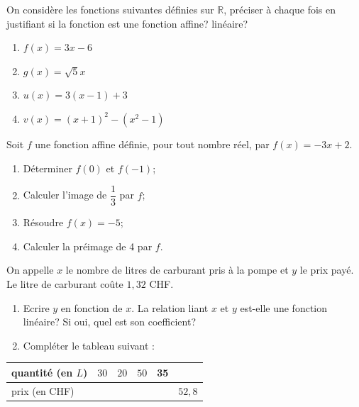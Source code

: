 

\begin{exercice}
On considère les fonctions suivantes définies sur $\mathbb{R}$, préciser à chaque fois en justifiant si la fonction est une fonction affine? linéaire?
\begin{enumerate}
\item $f(x)=3x-6$
\item $g(x)=\sqrt{5}x$
\item $u(x)=3(x-1)+3$
\item $v(x)=(x+1)^2-(x^2-1)$
\end{enumerate}
\end{exercice}

\begin{exercice}
Soit $f$ une fonction affine définie, pour tout nombre réel, par $f(x)=-3x+2$.
\begin{enumerate}
\item Déterminer $f(0)$ et $f(-1)$;
\item Calculer l'image de $\dfrac{1}{3}$ par $f$;
\item Résoudre $f(x)=-5$;
\item Calculer la préimage de 4 par $f$.
\end{enumerate}
\end{exercice}

\begin{exercice}
On appelle $x$ le nombre de litres de carburant pris à la pompe et $y$ le prix payé. Le litre de carburant coûte $1,32$ CHF.
\begin{enumerate}
\item Ecrire $y$ en fonction de $x$. La relation liant $x$ et $y$ est-elle une fonction linéaire? Si oui, quel est son coefficient?
\item Compléter le tableau suivant :
\end{enumerate}
\renewcommand{\arraystretch}{2}
\begin{tabular}{|p{1.2cm}|p{0.8cm}|p{0.8cm}|p{0.8cm}|p{0.8cm}|p{0.8cm}|}
 \hline
quantité (en $L$)&$30$&$20$&$50$&35&\\\hline
prix (en CHF)& &&&&$52,8$\\\hline
 \end{tabular}
\end{exercice}

